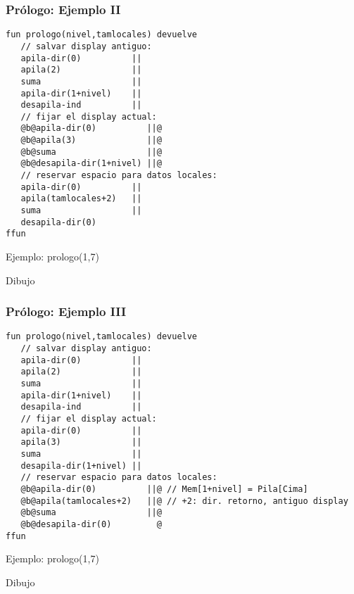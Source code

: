 \documentclass[hyperref={pdfpagelabels=false},tree-dvips]{beamer}
\begin{document}
\begin{frame}[fragile]
\frametitle{Prólogo: Ejemplo II}

\begin{lstlisting}[style=codigoMP,basicstyle=\tiny\ttfamily]
fun prologo(nivel,tamlocales) devuelve
   // salvar display antiguo:
   apila-dir(0)          ||
   apila(2)              ||
   suma                  ||
   apila-dir(1+nivel)    ||
   desapila-ind          ||
   // fijar el display actual:
   @b@apila-dir(0)          ||@
   @b@apila(3)              ||@
   @b@suma                  ||@
   @b@desapila-dir(1+nivel) ||@
   // reservar espacio para datos locales:
   apila-dir(0)          ||
   apila(tamlocales+2)   ||
   suma                  ||
   desapila-dir(0)
ffun
\end{lstlisting}

Ejemplo: prologo(1,7)

Dibujo

\end{frame}
\begin{frame}[fragile]
\frametitle{Prólogo: Ejemplo III}

\begin{lstlisting}[style=codigoMP,basicstyle=\tiny\ttfamily]
fun prologo(nivel,tamlocales) devuelve
   // salvar display antiguo:
   apila-dir(0)          ||
   apila(2)              ||
   suma                  ||
   apila-dir(1+nivel)    ||
   desapila-ind          ||
   // fijar el display actual:
   apila-dir(0)          ||
   apila(3)              ||
   suma                  ||
   desapila-dir(1+nivel) ||
   // reservar espacio para datos locales:
   @b@apila-dir(0)          ||@ // Mem[1+nivel] = Pila[Cima]
   @b@apila(tamlocales+2)   ||@ // +2: dir. retorno, antiguo display
   @b@suma                  ||@
   @b@desapila-dir(0)         @
ffun
\end{lstlisting}

Ejemplo: prologo(1,7)

Dibujo

\end{frame}
\end{document}
